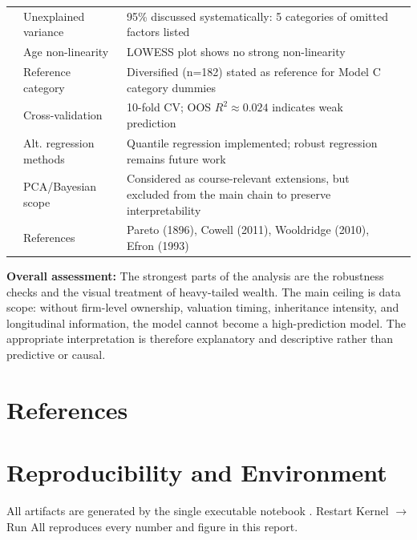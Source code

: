 \documentclass[a4paper,10pt]{article}
\begin{document}
\begin{table}[H]
\begin{tabular}{llp{6.5cm}c}
\midrule
 & Unexplained variance & 95\% discussed systematically: 5 categories of omitted factors listed & \cellcolor{yellow!25} \\
 & Age non-linearity & LOWESS plot shows no strong non-linearity & \cellcolor{green!25} \\
 & Reference category & Diversified (n=182) stated as reference for Model C category dummies & \cellcolor{green!25} \\
 & Cross-validation & 10-fold CV; OOS $R^2\approx0.024$ indicates weak prediction & \cellcolor{green!25} \\
 & Alt. regression methods & Quantile regression implemented; robust regression remains future work & \cellcolor{yellow!25} \\
 & PCA/Bayesian scope & Considered as course-relevant extensions, but excluded from the main chain to preserve interpretability & \cellcolor{yellow!25} \\
 & References & Pareto (1896), Cowell (2011), Wooldridge (2010), Efron (1993) & \cellcolor{green!25} \\
\bottomrule
\end{tabular}
\end{table}

\textbf{Overall assessment:} The strongest parts of the analysis are the robustness checks and the visual treatment of heavy-tailed wealth. The main ceiling is data scope: without firm-level ownership, valuation timing, inheritance intensity, and longitudinal information, the model cannot become a high-prediction model. The appropriate interpretation is therefore explanatory and descriptive rather than predictive or causal.

\bigskip

\section{References}\label{sec:refs}



\appendix

\section{Reproducibility and Environment}\label{sec:appendix}

All artifacts are generated by the single executable notebook
.
Restart Kernel $\rightarrow$ Run All reproduces every number and figure in this report.
\end{document}
